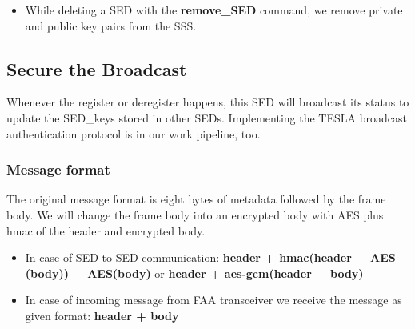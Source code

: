 \documentclass[11pt,oneside,onecolumn,letterpaper]{article}
\begin{document}
\begin{itemize}
      \item While deleting a SED with the \textbf{remove\_SED} command, we remove private and public key pairs from the SSS.
\end{itemize}

\subsection{Secure the Broadcast}
Whenever the register or deregister happens, this SED will broadcast its status to update the SED\_keys stored in other SEDs.
Implementing the TESLA broadcast authentication protocol is in our work pipeline, too.

\subsubsection{Message format}
The original message format is eight bytes of metadata followed by the frame body.
We will change the frame body into an encrypted body with AES plus hmac of the header and encrypted body.

  \begin{itemize}
  \item In case of SED to SED communication: \textbf{header + hmac(header + AES (body)) + AES(body)} or \textbf{header + aes-gcm(header + body)}
  \item In case of incoming message from FAA transceiver we receive the message as given format: \textbf{header + body}
  \end{itemize}
\end{document}
